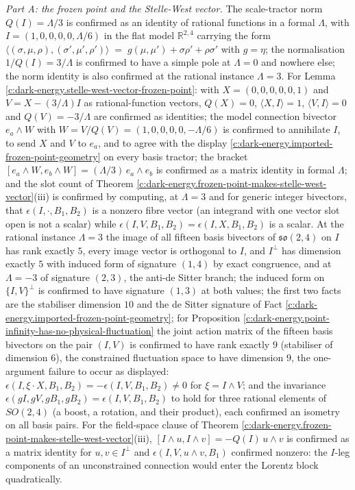 \documentclass[11pt]{article}
\theoremstyle{definition}
\theoremstyle{plain}
\providecommand{\ip}{}\renewcommand{\ip}[2]{\langle #1, #2\rangle}
\begin{document}
\emph{Part A: the frozen point and the Stelle-West vector.} The scale-tractor norm $Q(I) = \Lambda/3$ is confirmed as an identity of rational functions in a formal $\Lambda$, with $I = (1, 0, 0, 0, 0, \Lambda/6)$ in the flat model $\mathbb{R}^{2,4}$ carrying the form $\ip{(\sigma,\mu,\rho)}{(\sigma',\mu',\rho')} \;=\; g(\mu,\mu') + \sigma\rho' + \rho\sigma'$ with $g = \eta$; the normalisation $1/Q(I) = 3/\Lambda$ is confirmed to have a simple pole at $\Lambda = 0$ and nowhere else; the norm identity is also confirmed at the rational instance $\Lambda = 3$. For Lemma \ref{c:dark-energy.stelle-west-vector-frozen-point}: with $X = (0,0,0,0,0,1)$ and $V = X - (3/\Lambda)I$ as rational-function vectors, $Q(X) = 0$, $\langle X, I\rangle = 1$, $\langle V, I\rangle = 0$ and $Q(V) = -3/\Lambda$ are confirmed as identities; the model connection bivector $e_a\wedge W$ with $W = V/Q(V) = (1,0,0,0,0,-\Lambda/6)$ is confirmed to annihilate $I$, to send $X$ and $V$ to $e_a$, and to agree with the display \ref{c:dark-energy.imported-frozen-point-geometry} on every basis tractor; the bracket $[e_a\wedge W, e_b\wedge W] = (\Lambda/3)\,e_a\wedge e_b$ is confirmed as a matrix identity in formal $\Lambda$; and the slot count of Theorem \ref{c:dark-energy.frozen-point-makes-stelle-west-vector}(iii) is confirmed by computing, at $\Lambda = 3$ and for generic integer bivectors, that $\epsilon(I, \cdot, B_1, B_2)$ is a nonzero fibre vector (an integrand with one vector slot open is not a scalar) while $\epsilon(I, V, B_1, B_2) = \epsilon(I, X, B_1, B_2)$ is a scalar. At the rational instance $\Lambda = 3$ the image of all fifteen basis bivectors of $\mathfrak{so}(2,4)$ on $I$ has rank exactly $5$, every image vector is orthogonal to $I$, and $I^{\perp}$ has dimension exactly $5$ with induced form of signature $(1,4)$ by exact congruence, and at $\Lambda = -3$ of signature $(2,3)$, the anti-de Sitter branch; the induced form on $\{I,V\}^\perp$ is confirmed to have signature $(1,3)$ at both values; the first two facts are the stabiliser dimension $10$ and the de Sitter signature of Fact \ref{c:dark-energy.imported-frozen-point-geometry}; for Proposition \ref{c:dark-energy.point-infinity-has-no-physical-fluctuation} the joint action matrix of the fifteen basis bivectors on the pair $(I, V)$ is confirmed to have rank exactly $9$ (stabiliser of dimension $6$), the constrained fluctuation space to have dimension $9$, the one-argument failure to occur as displayed: $\epsilon(I, \xi\cdot X, B_1, B_2) = -\epsilon(I, V, B_1, B_2) \neq 0$ for $\xi = I\wedge V$; and the invariance $\epsilon(gI, gV, gB_1, gB_2) = \epsilon(I, V, B_1, B_2)$ to hold for three rational elements of $SO(2,4)$ (a boost, a rotation, and their product), each confirmed an isometry on all basis pairs. For the field-space clause of Theorem \ref{c:dark-energy.frozen-point-makes-stelle-west-vector}(iii), $[I\wedge u, I\wedge v] = -Q(I)\,u\wedge v$ is confirmed as a matrix identity for $u, v \in I^\perp$ and $\epsilon(I, V, u\wedge v, B_1)$ confirmed nonzero: the $I$-leg components of an unconstrained connection would enter the Lorentz block quadratically.
\end{document}
